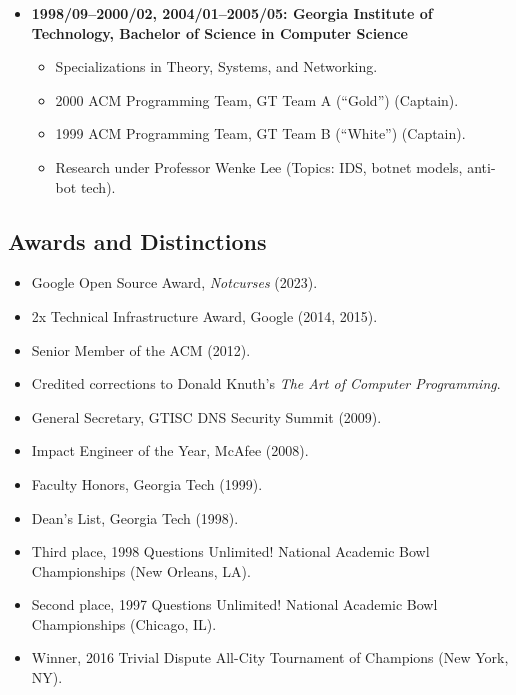 \documentclass{article}
\newenvironment{tightitemize}
{\begin{itemize}
  \setlength{\itemsep}{1pt}
  \setlength{\parskip}{0pt}
  \setlength{\parsep}{0pt}}
{\end{itemize}}
\begin{document}
\begin{tightitemize}
\item \textbf{1998/09--2000/02, 2004/01--2005/05: Georgia Institute of Technology,
Bachelor of Science in Computer Science}
\begin{tightitemize}
\item Specializations in Theory, Systems, and Networking.
\item 2000 ACM Programming Team, GT Team A (``Gold'') (Captain).
\item 1999 ACM Programming Team, GT Team B (``White'') (Captain).
\item Research under Professor Wenke Lee (Topics: IDS, botnet models, anti-bot tech).
\end{tightitemize}
\end{tightitemize}

\vspace{3mm}
\subsection*{Awards and Distinctions}
\begin{tightitemize}
\item Google Open Source Award, \textit{Notcurses} (2023).
\item 2x Technical Infrastructure Award, Google (2014, 2015).
\item Senior Member of the ACM (2012).
\item Credited corrections to Donald Knuth's \textit{The Art of Computer Programming}.
\item General Secretary, GTISC DNS Security Summit (2009).
\item Impact Engineer of the Year, McAfee (2008).
\item Faculty Honors, Georgia Tech (1999).
\item Dean's List, Georgia Tech (1998).
\item Third place, 1998 Questions Unlimited! National Academic Bowl Championships (New Orleans, LA).
\item Second place, 1997 Questions Unlimited! National Academic Bowl Championships (Chicago, IL).
\item Winner, 2016 Trivial Dispute All-City Tournament of Champions (New York, NY).
\end{tightitemize}

\vspace{3mm}
\end{document}
